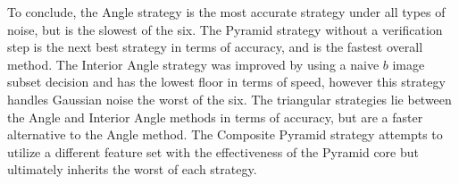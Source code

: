 To conclude, the Angle strategy is the most accurate strategy under all types of noise, but is the slowest of the six.
The Pyramid strategy without a verification step is the next best strategy in terms of accuracy, and is the fastest overall method.
The Interior Angle strategy was improved by using a naive $b$ image subset decision and has the lowest floor in terms of speed, however this strategy handles Gaussian noise the worst of the six. 
The triangular strategies lie between the Angle and Interior Angle methods in terms of accuracy, but are a faster alternative to the Angle method.
The Composite Pyramid strategy attempts to utilize a different feature set with the effectiveness of the Pyramid core but ultimately inherits the worst of each strategy.

\begin{figure}
\end{figure}



